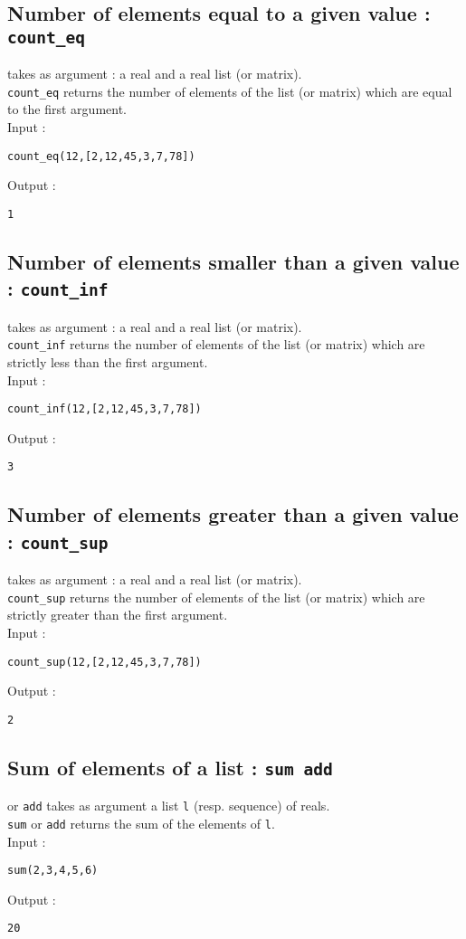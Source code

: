 \documentclass[a4paper,11pt]{book}
\begin{document}
\subsection{Number of elements equal to a given value : {\tt count\_eq}}
 takes as argument : a real and a real list
(or matrix).\\
{\tt count\_eq} returns the number of elements of the list (or matrix)
which are equal to the first argument.\\
Input :
\begin{center}{\tt count\_eq(12,[2,12,45,3,7,78])}\end{center}
Output :
\begin{center}{\tt  1}\end{center}

\subsection{Number of elements smaller than a given value : {\tt count\_inf}}
 takes as argument : a real and a real list 
(or matrix).\\
{\tt count\_inf} returns the number of elements of the list (or matrix) which
are strictly less than the first argument.\\
Input :
\begin{center}{\tt count\_inf(12,[2,12,45,3,7,78])}\end{center}
Output :
\begin{center}{\tt  3}\end{center}

\subsection{Number of elements greater than a given value : {\tt count\_sup}}
 takes as argument : a real and a real list 
(or matrix).\\
{\tt count\_sup} returns the number of elements of the list 
(or matrix) which are strictly greater than the first argument.\\
Input :
\begin{center}{\tt count\_sup(12,[2,12,45,3,7,78])}\end{center}
Output :
\begin{center}{\tt  2}\end{center}

\subsection{Sum of elements of a list : {\tt sum add}}
 or {\tt add} takes as argument a list {\tt l} (resp. 
sequence) of reals.\\ 
{\tt sum} or {\tt add} returns the sum of the elements of {\tt l}.\\
Input :
\begin{center}{\tt sum(2,3,4,5,6)}\end{center}
Output :
\begin{center}{\tt 20}\end{center}
\end{document}
